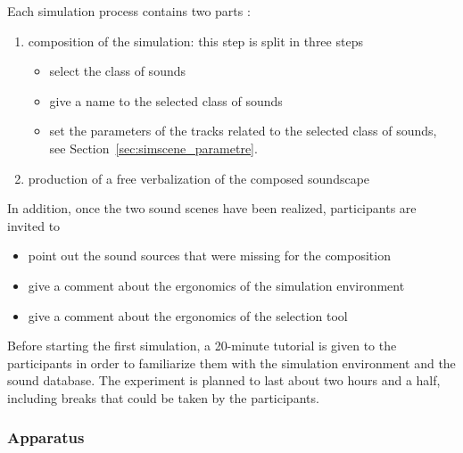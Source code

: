 \documentclass[twoside,twocolumn]{article}
\begin{document}
Each simulation process contains two parts :
\begin{enumerate}
\item composition of the simulation: this step is split in three steps
\begin{itemize}
  \item  select the class of sounds
	\item  give a name to the selected class of sounds
	\item  set the parameters of the tracks related to the selected class of sounds, see Section~\ref{sec:simscene_parametre}.
\end{itemize}
\item production of a free verbalization of the composed soundscape
\end{enumerate}

In addition, once the two sound scenes have been realized, participants are invited to
\begin{itemize}
\item  point out the sound sources that were missing for the composition
\item  give a comment about the ergonomics of the simulation environment
\item   give a comment about the ergonomics of the selection tool
\end{itemize}

Before starting the first simulation, a 20-minute tutorial is given to the participants in order to familiarize them with the simulation environment and the sound database. The experiment is planned to last about two hours and a half, including breaks that could be taken by the participants.

\subsubsection*{Apparatus}

%
%
\end{document}
